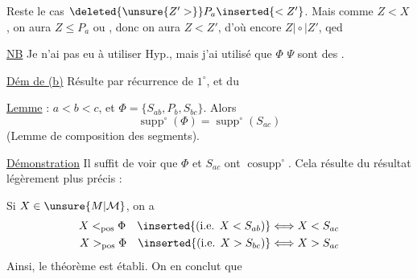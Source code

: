 Reste le cas $\deleted{\unsure{Z'>}}P_a\inserted{<Z'}$. Mais comme $Z<X$, on aura $Z\leq P_a$ ou , donc on aura $Z<Z'$, d'où encore $Z\mathrel{\mid\circ\mid}Z'$, qed

\uline{NB} Je n'ai pas eu à utiliser Hyp.,  mais  j'ai utilisé  que $\Phi$ $\Psi$ sont des .

\uline{Dém de (b)} Résulte par récurrence  de $1^{\circ}$, et du 

\uline{Lemme} :  $a<b<c$, et $\Phi=\{S_{ab},P_b,S_{bc}\}$. Alors
\[
\operatorname{supp}^{\circ}(\Phi)=\operatorname{supp}^{\circ}(S_{ac})
\]
(Lemme de composition des segments).

\uline{Démonstration} Il suffit de voir que $\Phi$ et $S_{ac}$ ont  $\operatorname{cosupp}^{\circ}$.  Cela résulte du résultat légèrement plus  précis :

Si $X\in\unsure{M|\mathcal{M}}$, on a
\[
\begin{aligned}
X<_{\mathrm{pos}}\Phi\quad\inserted{\text{(i.e. }X<S_{ab}\text{)}}&\Longleftrightarrow X<S_{ac}\\
X>_{\mathrm{pos}}\Phi\quad\inserted{\text{(i.e. }X>S_{bc}\text{)}}&\Longleftrightarrow X>S_{ac}
\end{aligned}
\]
Ainsi, le théorème est établi. On en conclut que 



